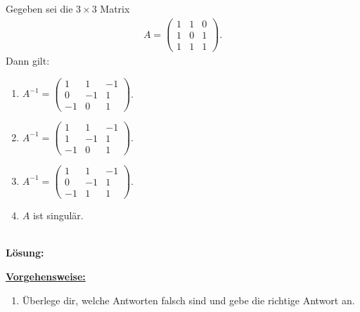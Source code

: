 \subsection*{}
Gegeben sei die $3 \times 3 $ Matrix
\begin{align*}
A
= 
\begin{pmatrix}
1 & 1 & 0\\
1 & 0 & 1 \\
1 & 1 & 1
\end{pmatrix}.
\end{align*}
Dann gilt:
\renewcommand{\labelenumi}{(\alph{enumi})}
\begin{enumerate}
\item 
$A^{-1}
= 
\begin{pmatrix}
1 & 1 & -1 \\
0 & -1 & 1\\
-1 & 0 & 1
\end{pmatrix}$.
\item
$A^{-1}
= 
\begin{pmatrix}
1 & 1 & -1 \\
1 & -1 & 1\\
-1 & 0 & 1
\end{pmatrix}$.
\item
$A^{-1}
= 
\begin{pmatrix}
1 & 1 & -1 \\
0 & -1 & 1\\
-1 & 1 & 1
\end{pmatrix}$.
\item
$A$ ist singulär.
\end{enumerate}
\ \\
\textbf{Lösung:}
\begin{mdframed}
\underline{\textbf{Vorgehensweise:}}
\renewcommand{\labelenumi}{\theenumi.}
\begin{enumerate}
\item Überlege dir, welche Antworten falsch sind und gebe die richtige Antwort an.

\end{enumerate}
\end{mdframed}

